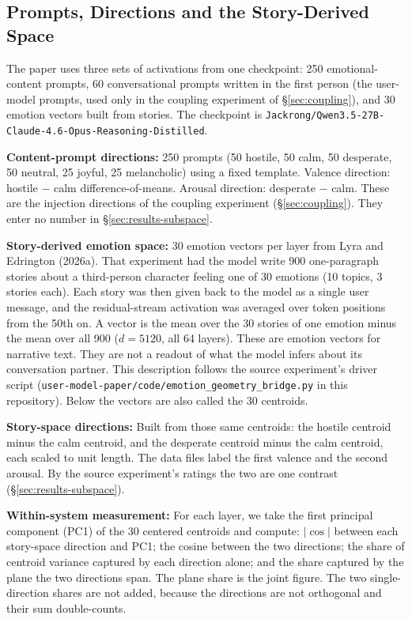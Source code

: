 \documentclass[11pt,a4paper]{article}
\begin{document}
\subsection{Prompts, Directions and the Story-Derived Space}
\label{sec:shared-subspace}

{\sloppy The paper uses three sets of activations from one checkpoint: 250 emotional-content prompts, 60 conversational prompts written in the first person (the user-model prompts, used only in the coupling experiment of \S\ref{sec:coupling}), and 30 emotion vectors built from stories. The checkpoint is \texttt{Jackrong/\allowbreak Qwen3.5-27B-\allowbreak Claude-4.6-\allowbreak Opus-\allowbreak Reasoning-\allowbreak Distilled}.\par}

\textbf{Content-prompt directions:} 250 prompts (50 hostile, 50 calm, 50 desperate, 50 neutral, 25 joyful, 25 melancholic) using a fixed template. Valence direction: hostile $-$ calm difference-of-means. Arousal direction: desperate $-$ calm. These are the injection directions of the coupling experiment (\S\ref{sec:coupling}). They enter no number in \S\ref{sec:results-subspace}.

\textbf{Story-derived emotion space:} 30 emotion vectors per layer from Lyra and Edrington (2026a). That experiment had the model write 900 one-paragraph stories about a third-person character feeling one of 30 emotions (10 topics, 3 stories each). Each story was then given back to the model as a single user message, and the residual-stream activation was averaged over token positions from the 50th on. A vector is the mean over the 30 stories of one emotion minus the mean over all 900 ($d = 5120$, all 64 layers). These are emotion vectors for narrative text. They are not a readout of what the model infers about its conversation partner. This description follows the source experiment's driver script (\texttt{user-model-paper/\allowbreak code/\allowbreak emotion\_\allowbreak geometry\_\allowbreak bridge.py} in this repository). Below the vectors are also called the 30 centroids.

\textbf{Story-space directions:} Built from those same centroids: the hostile centroid minus the calm centroid, and the desperate centroid minus the calm centroid, each scaled to unit length. The data files label the first valence and the second arousal. By the source experiment's ratings the two are one contrast (\S\ref{sec:results-subspace}).

\textbf{Within-system measurement:} For each layer, we take the first principal component (PC1) of the 30 centered centroids and compute: $|\cos|$ between each story-space direction and PC1; the cosine between the two directions; the share of centroid variance captured by each direction alone; and the share captured by the plane the two directions span. The plane share is the joint figure. The two single-direction shares are not added, because the directions are not orthogonal and their sum double-counts.
\end{document}
